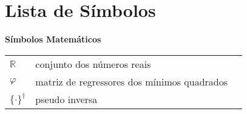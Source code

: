
\chapter*{Lista de Símbolos}

\begin{spacing}{1.45}

\noindent \textbf{Símbolos Matemáticos}

\begin{longtable}{L{1.5cm}L{14cm}L{\textwidth}}

$\mathbb{R}$ & conjunto dos números reais & \\
$\varphi$ & matriz de regressores dos mínimos quadrados &\\
${\{ \cdot \}}^\dagger$ & pseudo inversa &\\





\end{longtable}

\end{spacing}

